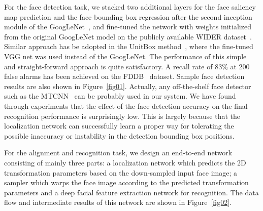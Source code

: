 \documentclass[10pt,twocolumn,letterpaper]{article}
\begin{document}
For the face detection task, we stacked two additional layers for the face saliency map prediction and the face bounding box regression after the second inception module of the GoogLeNet~\cite{Szegedy2015Going}, and fine-tuned the network with weights initialized from the original GoogLeNet model on the publicly available WIDER dataset~\cite{yang2016wider}. 
Similar approach has be adopted in the UnitBox method~\cite{Yu2016UnitBox}, where the fine-tuned VGG net was used instead of the GoogLeNet. 
The performance of this simple and straight-forward approach is quite satisfactory. 
A recall rate of 83\% at 200 false alarms has been achieved on the FDDB~\cite{fddbTech} dataset.
Sample face detection results are also shown in Figure~\ref{fig01}.
Actually, any off-the-shelf face detector such as the MTCNN~\cite{zhang2016joint} can be probably used in our system. 
We have found through experiments that the effect of the face detection accuracy on the final recognition performance is surprisingly low. 
This is largely because that the localization network can successfully learn a proper way for tolerating the possible inaccuracy or instability in the detection bounding box positions.

For the alignment and recognition task, we design an end-to-end network consisting of mainly three parts: a localization network which predicts the 2D transformation parameters based on the down-sampled input face image; a sampler which warps the face image according to the predicted transformation parameters and a deep facial feature extraction network for recognition. The data flow and intermediate results of this network are shown in Figure~\ref{fig02}. 
\end{document}
